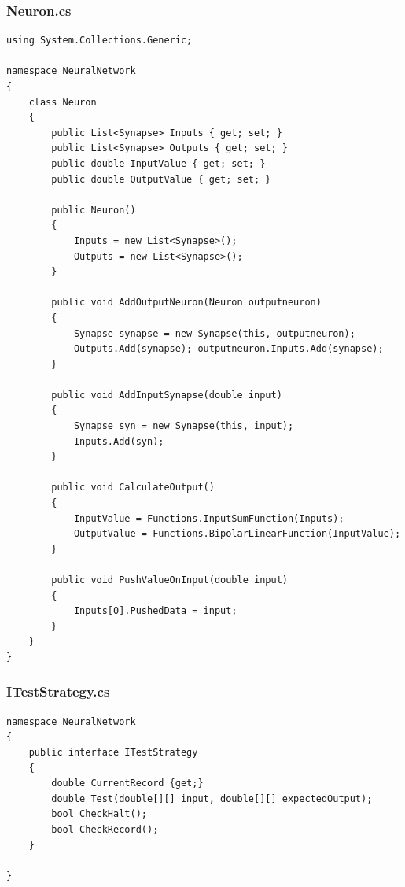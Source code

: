 \documentclass[12pt,a4paper]{article}
\begin{document}
\subsubsection*{Neuron.cs}
\begin{lstlisting}
using System.Collections.Generic;

namespace NeuralNetwork
{
    class Neuron
    {
        public List<Synapse> Inputs { get; set; }
        public List<Synapse> Outputs { get; set; }
        public double InputValue { get; set; }
        public double OutputValue { get; set; }

        public Neuron()
        {
            Inputs = new List<Synapse>();
            Outputs = new List<Synapse>();
        }

        public void AddOutputNeuron(Neuron outputneuron)
        {
            Synapse synapse = new Synapse(this, outputneuron);
            Outputs.Add(synapse); outputneuron.Inputs.Add(synapse);
        }

        public void AddInputSynapse(double input)
        {
            Synapse syn = new Synapse(this, input);
            Inputs.Add(syn);
        }

        public void CalculateOutput()
        {
            InputValue = Functions.InputSumFunction(Inputs);
            OutputValue = Functions.BipolarLinearFunction(InputValue);
        }

        public void PushValueOnInput(double input) 
        { 
            Inputs[0].PushedData = input; 
        }
    }
}\end{lstlisting}
\pagebreak


\subsubsection*{ITestStrategy.cs}
\begin{lstlisting}
namespace NeuralNetwork
{
    public interface ITestStrategy
    {
        double CurrentRecord {get;}
        double Test(double[][] input, double[][] expectedOutput);
        bool CheckHalt();
        bool CheckRecord();
    }

}\end{lstlisting}
\pagebreak
\end{document}
